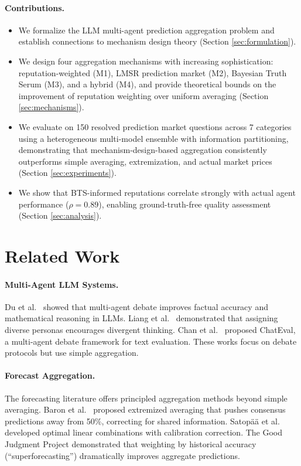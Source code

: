 \documentclass[conference]{IEEEtran}
\begin{document}
\paragraph{Contributions.}
\begin{itemize}
    \item We formalize the LLM multi-agent prediction aggregation problem and establish connections to mechanism design theory (Section \ref{sec:formulation}).
    \item We design four aggregation mechanisms with increasing sophistication: reputation-weighted (M1), LMSR prediction market (M2), Bayesian Truth Serum (M3), and a hybrid (M4), and provide theoretical bounds on the improvement of reputation weighting over uniform averaging (Section \ref{sec:mechanisms}).
    \item We evaluate on 150 resolved prediction market questions across 7 categories using a heterogeneous multi-model ensemble with information partitioning, demonstrating that mechanism-design-based aggregation consistently outperforms simple averaging, extremization, and actual market prices (Section \ref{sec:experiments}).
    \item We show that BTS-informed reputations correlate strongly with actual agent performance ($\rho = 0.89$), enabling ground-truth-free quality assessment (Section \ref{sec:analysis}).
\end{itemize}


\section{Related Work}
\label{sec:related}

\paragraph{Multi-Agent LLM Systems.}
Du et al.~\cite{du2023improving} showed that multi-agent debate improves factual accuracy and mathematical reasoning in LLMs. Liang et al.~\cite{liang2023encouraging} demonstrated that assigning diverse personas encourages divergent thinking. Chan et al.~\cite{chan2023chateval} proposed ChatEval, a multi-agent debate framework for text evaluation. These works focus on debate protocols but use simple aggregation.

\paragraph{Forecast Aggregation.}
The forecasting literature offers principled aggregation methods beyond simple averaging. Baron et al.~\cite{baron2014two} proposed extremized averaging that pushes consensus predictions away from 50\%, correcting for shared information. Satop\"a\"a et al.~\cite{satopaa2014combining} developed optimal linear combinations with calibration correction. The Good Judgment Project \cite{tetlock2016superforecasting} demonstrated that weighting by historical accuracy (``superforecasting'') dramatically improves aggregate predictions.
\end{document}
